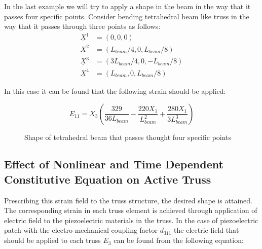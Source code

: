 In the last example we will try to apply a shape in the beam in the way that it passes four specific points.
Consider bending tetrahedral beam like truss in the way that it passes through three points as follows:
\begin{equation}
\begin{aligned}
\underline X ^1&=(0,0,0) \\
\underline X ^2&=(L_{beam}/4,0,L_{beam}/8) \\
\underline X ^3&=(3 L_{beam}/4,0,-L_{beam}/8) \\
\underline X ^4&=(L_{beam},0,L_{beam}/8)
\end{aligned}
\label{three_points:eqn}
\end{equation}

In this case it can be found that the following strain should be applied:


\begin{equation}
E_{11}=X_3 \left(
\frac{329}{36L_{beam}} -
\frac{220 X_1}{L_{beam}^2} +
\frac{280 X_1}{ 3 L_{beam}^3}  \right)
\label{three_points_strain:eqn}
\end{equation}


\begin{figure}
\centering
{}
\caption{Shape of tetrahedral beam that passes thought four specific points}
\label{fig:tetra_hedral_three_point}
\end{figure}

\subsection{Effect of Nonlinear and Time Dependent Constitutive Equation on Active Truss}
Prescribing this strain field to the truss structure, the desired shape is attained.
The corresponding strain in each truss element is achieved through application of electric field to the piezoelectric materials in the truss.
In the case of piezoelectric patch with the electro-mechanical coupling factor $d_{311}$ the electric field that should be applied to each truss $E_3$ can be found from the following equation:

